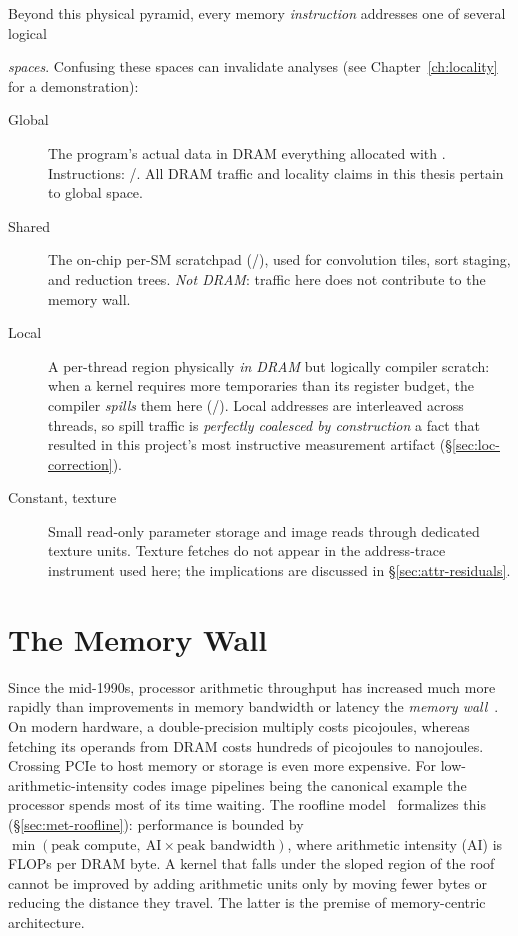 Beyond this physical pyramid, every memory \emph{instruction} addresses one of several logical

\emph{spaces}. Confusing these spaces can invalidate analyses (see Chapter~\ref{ch:locality} for a demonstration):

\begin{description}
\item[Global] The program's actual data in DRAM everything allocated with . Instructions: /. All DRAM traffic and locality claims in this thesis pertain to global space.

\item[Shared] The on-chip per-SM scratchpad (/), used for convolution tiles, sort staging, and reduction trees. \emph{Not DRAM}: traffic here does not contribute to the memory wall.

\item[Local] A per-thread region physically \emph{in DRAM} but logically compiler scratch: when a kernel requires more temporaries than its register budget, the compiler \emph{spills} them here (/). Local addresses are interleaved across threads, so spill traffic is \emph{perfectly coalesced by construction} a fact that resulted in this project's most instructive measurement artifact (\S\ref{sec:loc-correction}).

\item[Constant, texture] Small read-only parameter storage and image reads through dedicated texture units. Texture fetches do not appear in the address-trace instrument used here; the implications are 
discussed in \S\ref{sec:attr-residuals}.
\end{description}

\section{The Memory Wall}
\label{sec:bg-wall}

Since the mid-1990s, processor arithmetic throughput has increased much more rapidly than improvements in memory bandwidth or latency the \emph{memory wall}~\cite{wulf1995memorywall}. On modern hardware, a double-precision multiply costs picojoules, whereas fetching its operands from DRAM costs hundreds of picojoules to nanojoules. Crossing PCIe to host memory or storage is even more expensive. For low-arithmetic-intensity codes image pipelines being the canonical example the processor spends most of its time waiting. The roofline model~\cite{williams2009roofline} formalizes this (\S\ref{sec:met-roofline}): performance is bounded by $\min(\text{peak compute},\ \text{AI}\times\text{peak bandwidth})$, where arithmetic intensity (AI) is FLOPs per DRAM byte. A kernel that falls under the sloped region of the roof cannot be improved by adding arithmetic units only by moving fewer bytes or reducing the distance they travel. The latter is the premise of memory-centric architecture.

